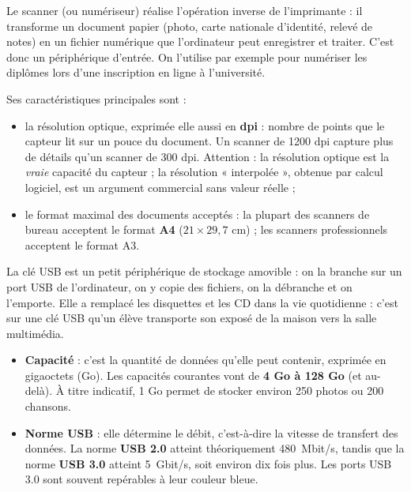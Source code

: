 \documentclass[11pt]{article}
\newcommand{\cle}[1]{{\popxbold\color{popdark}#1}}
\newcounter{popsec}
\newcounter{popsub}
\newcommand{\courssub}[1]{%
  \stepcounter{popsub}%
  \par\vspace{9pt}\noindent{\popxbold\fontsize{11.5}{13}\selectfont\color{popink}{\color{poporange}\thepopsec.\thepopsub}\hspace{6pt}#1}\par\nopagebreak\vspace{4pt}
}
\begin{document}
\courssub{Le scanner}

Le \cle{scanner} (ou numériseur) réalise l'opération inverse de l'imprimante : il transforme un document papier (photo, carte nationale d'identité, relevé de notes) en un fichier numérique que l'ordinateur peut enregistrer et traiter. C'est donc un périphérique d'\cle{entrée}. On l'utilise par exemple pour numériser les diplômes lors d'une inscription en ligne à l'université.

Ses caractéristiques principales sont :
\begin{itemize}
\item la \cle{résolution optique}, exprimée elle aussi en \textbf{dpi} : nombre de points que le capteur lit sur un pouce du document. Un scanner de 1200 dpi capture plus de détails qu'un scanner de 300 dpi. Attention : la résolution optique est la \emph{vraie} capacité du capteur ; la résolution « interpolée », obtenue par calcul logiciel, est un argument commercial sans valeur réelle ;
\item le \cle{format} maximal des documents acceptés : la plupart des scanners de bureau acceptent le format \textbf{A4} ($21 \times 29{,}7$ cm) ; les scanners professionnels acceptent le format A3.
\end{itemize}

\courssub{La clé USB}

La \cle{clé USB} est un petit périphérique de \cle{stockage amovible} : on la branche sur un port USB de l'ordinateur, on y copie des fichiers, on la débranche et on l'emporte. Elle a remplacé les disquettes et les CD dans la vie quotidienne : c'est sur une clé USB qu'un élève transporte son exposé de la maison vers la salle multimédia.

\begin{itemize}
\item \textbf{Capacité} : c'est la quantité de données qu'elle peut contenir, exprimée en gigaoctets (Go). Les capacités courantes vont de \textbf{4 Go à 128 Go} (et au-delà). À titre indicatif, 1 Go permet de stocker environ 250 photos ou 200 chansons.
\item \textbf{Norme USB} : elle détermine le \cle{débit}, c'est-à-dire la vitesse de transfert des données. La norme \textbf{USB 2.0} atteint théoriquement \SI{480}{Mbit/s}, tandis que la norme \textbf{USB 3.0} atteint \SI{5}{Gbit/s}, soit environ dix fois plus. Les ports USB 3.0 sont souvent repérables à leur couleur bleue.
\end{itemize}
\end{document}
